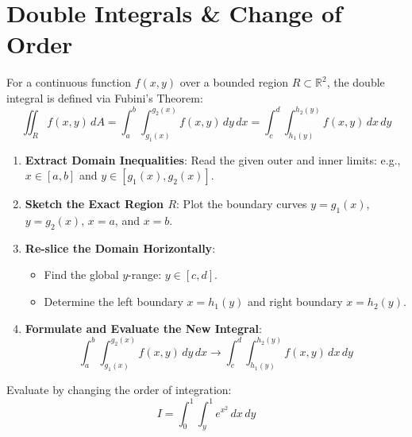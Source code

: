 \section{Double Integrals \& Change of Order}

\begin{definition}
For a continuous function $f(x,y)$ over a bounded region $R \subset \mathbb{R}^2$, the double integral is defined via Fubini's Theorem:
\begin{equation}
\iint_R f(x,y)\,dA = \int_{a}^b \int_{g_1(x)}^{g_2(x)} f(x,y)\,dy\,dx = \int_{c}^d \int_{h_1(y)}^{h_2(y)} f(x,y)\,dx\,dy
\end{equation}
\end{definition}

\begin{methodbox}
\begin{enumerate}[leftmargin=1.5em]
    \item \textbf{Extract Domain Inequalities}: Read the given outer and inner limits: e.g., $x \in [a,b]$ and $y \in [g_1(x), g_2(x)]$.
    \item \textbf{Sketch the Exact Region $R$}: Plot the boundary curves $y = g_1(x)$, $y = g_2(x)$, $x = a$, and $x = b$.
    \item \textbf{Re-slice the Domain Horizontally}:
    \begin{itemize}
        \item Find the global $y$-range: $y \in [c, d]$.
        \item Determine the left boundary $x = h_1(y)$ and right boundary $x = h_2(y)$.
    \end{itemize}
    \item \textbf{Formulate and Evaluate the New Integral}:
    \begin{equation}
    \int_a^b \int_{g_1(x)}^{g_2(x)} f(x,y)\,dy\,dx \longrightarrow \int_c^d \int_{h_1(y)}^{h_2(y)} f(x,y)\,dx\,dy
    \end{equation}
\end{enumerate}
\end{methodbox}

\begin{example}
Evaluate by changing the order of integration:
\begin{equation}
I = \int_0^1 \int_y^1 e^{x^2}\,dx\,dy
\end{equation}
\end{example}

